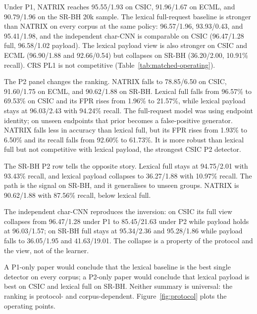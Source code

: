 \documentclass[preprint,11pt]{elsarticle}
\begin{document}
Under P1, NATRIX reaches 95.55/1.93 on CSIC, 91.96/1.67 on ECML, and
90.79/1.96 on the SR-BH 20k sample. The lexical full-request baseline is
stronger than NATRIX on every corpus at the same policy: 96.57/1.96,
93.93/0.43, and 95.41/1.98, and the independent char-CNN is comparable
on CSIC (96.47/1.28 full, 96.58/1.02 payload). The lexical payload view
is also stronger on CSIC and ECML (96.90/1.88 and 92.66/0.54) but
collapses on SR-BH (36.20/2.00, 10.91\% recall). CRS PL1 is not
competitive (Table~\ref{tab:matched-operating}).

The P2 panel changes the ranking. NATRIX falls to 78.85/6.50 on CSIC,
91.60/1.75 on ECML, and 90.62/1.88 on SR-BH. Lexical full falls from
96.57\% to 69.53\% on CSIC and its FPR rises from 1.96\% to 21.57\%,
while lexical payload stays at 96.03/2.43 with 94.24\% recall. The
full-request model was using endpoint identity; on unseen endpoints that
prior becomes a false-positive generator. NATRIX falls less in accuracy
than lexical full, but its FPR rises from 1.93\% to 6.50\% and its
recall falls from 92.60\% to 61.73\%. It is more robust than lexical
full but not competitive with lexical payload, the strongest CSIC P2
detector.

The SR-BH P2 row tells the opposite story. Lexical full stays at
94.75/2.01 with 93.43\% recall, and lexical payload collapses to
36.27/1.88 with 10.97\% recall. The path is the signal on SR-BH, and it
generalises to unseen groups. NATRIX is 90.62/1.88 with 87.56\% recall,
below lexical full.

The independent char-CNN reproduces the inversion: on CSIC its full view
collapses from 96.47/1.28 under P1 to 85.45/21.63 under P2 while payload
holds at 96.03/1.57; on SR-BH full stays at 95.34/2.36 and 95.28/1.86
while payload falls to 36.05/1.95 and 41.63/19.01. The collapse is a
property of the protocol and the view, not of the learner.

A P1-only paper would conclude that the lexical baseline is the best
single detector on every corpus; a P2-only paper would conclude that
lexical payload is best on CSIC and lexical full on SR-BH. Neither
summary is universal: the ranking is protocol- and corpus-dependent.
Figure~\ref{fig:protocol} plots the operating points.
\end{document}
